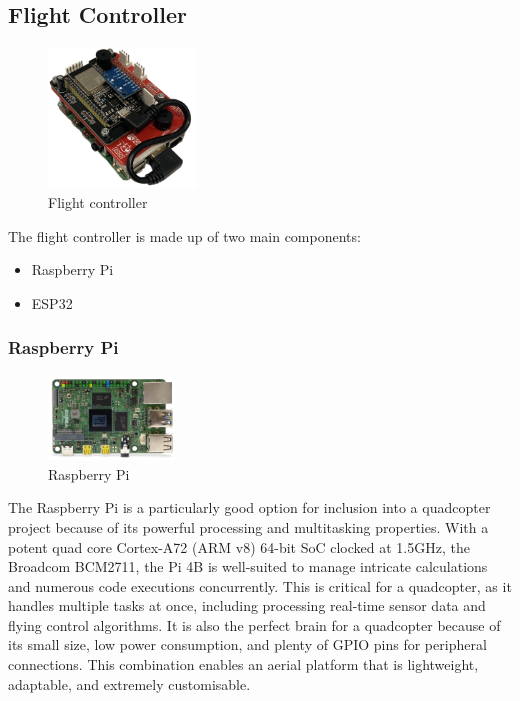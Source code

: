 \documentclass{article}
\begin{document}
\subsection{Flight Controller}\label{flight_controller}
\begin{figure}[H]
  \centering
  \includegraphics[width=0.35\textwidth]{Pictures/flight_controller.png}
  \caption{Flight controller}
  \label{fig:flightController}
\end{figure}
The flight controller is made up of two main components:
\begin{itemize}
  \item Raspberry Pi
  \item ESP32
\end{itemize}
\subsubsection{Raspberry Pi}
\begin{figure}[H]
  \centering
  \includegraphics[width=0.3\textwidth]{Pictures/raspberry_pi.png}
  \caption{Raspberry Pi}
  \label{fig:rasberry_pi}  
\end{figure}
The Raspberry Pi is a particularly good option for inclusion into a quadcopter
project because of its powerful processing and multitasking properties. With a
potent quad core Cortex-A72 (ARM v8) 64-bit SoC clocked at 1.5GHz, the Broadcom
BCM2711, the Pi 4B is well-suited to manage intricate calculations and numerous
code executions concurrently. This is critical for a quadcopter, as it handles
multiple tasks at once, including processing real-time sensor data and flying
control algorithms. It is also the perfect brain for a quadcopter because of its
small size, low power consumption, and plenty of GPIO pins for peripheral
connections. This combination enables an aerial platform that is lightweight,
adaptable, and extremely customisable.
\end{document}

